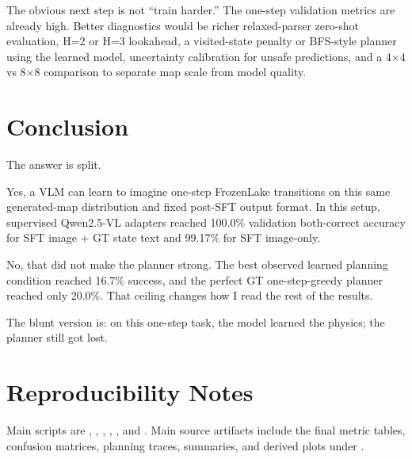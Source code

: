 \documentclass{article}
\begin{document}
The obvious next step is not ``train harder.'' The one-step validation metrics are already high. Better diagnostics would be richer relaxed-parser zero-shot evaluation, H=2 or H=3 lookahead, a visited-state penalty or BFS-style planner using the learned model, uncertainty calibration for unsafe predictions, and a 4$\times$4 vs 8$\times$8 comparison to separate map scale from model quality.

\section{Conclusion}

The answer is split.

Yes, a VLM can learn to imagine one-step FrozenLake transitions on this same generated-map distribution and fixed post-SFT output format. In this setup, supervised Qwen2.5-VL adapters reached 100.0\% validation both-correct accuracy for SFT image + GT state text and 99.17\% for SFT image-only.

No, that did not make the planner strong. The best observed learned planning condition reached 16.7\% success, and the perfect GT one-step-greedy planner reached only 20.0\%. That ceiling changes how I read the rest of the results.

The blunt version is: on this one-step task, the model learned the physics; the planner still got lost.

\section*{Reproducibility Notes}

Main scripts are , , , , , and . Main source artifacts include the final metric tables, confusion matrices, planning traces, summaries, and derived plots under .
\end{document}
